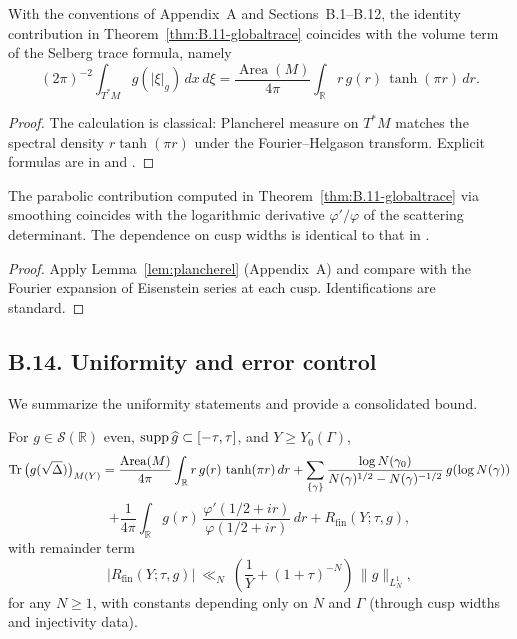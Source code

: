 \begin{proposition}\label{prop:B.13-norm}
With the conventions of Appendix~A and Sections~B.1–B.12, the identity contribution
in Theorem~\ref{thm:B.11-globaltrace} coincides with the volume term of the Selberg
trace formula, namely
\[
(2\pi)^{-2}\int_{T^*M} g(|\xi|_g)\,dx\,d\xi = \frac{\operatorname{Area}(M)}{4\pi}\int_{\mathbb R} r\,g(r)\,\tanh(\pi r)\,dr.
\]
\end{proposition}

\begin{proof}
The calculation is classical: Plancherel measure on $T^*M$ matches the spectral
density $r\tanh(\pi r)$ under the Fourier--Helgason transform. Explicit formulas
are in \cite[Chap.~7]{Hejhal1983} and \cite[§2.3]{Iwaniec2002}.
\end{proof}

\begin{lemma}\label{lem:B.13-parabolic}
The parabolic contribution computed in Theorem~\ref{thm:B.11-globaltrace} via
smoothing coincides with the logarithmic derivative $\varphi'/\varphi$ of the
scattering determinant. The dependence on cusp widths is identical to that in
\cite[§3]{Hejhal1983}.
\end{lemma}

\begin{proof}
Apply Lemma~\ref{lem:plancherel} (Appendix~A) and compare with the Fourier expansion
of Eisenstein series at each cusp. Identifications are standard.
\end{proof}

\subsection*{B.14. Uniformity and error control}

\noindent
We summarize the uniformity statements and provide a consolidated bound.

\begin{theorem}\label{thm:B.14-consolidated}
For $g\in\mathcal S(\mathbb R)$ even, $\operatorname{supp} \widehat g\subset [-\tau,\tau]$, and
$Y\ge Y_0(\Gamma)$,
\[
\operatorname{Tr}\big(g(\sqrt\Delta)\big)_{M(Y)} =
\frac{\operatorname{Area}(M)}{4\pi}\int_{\mathbb R} r\,g(r)\,\tanh(\pi r)\,dr
+ \sum_{\{\gamma\}} \frac{\log N(\gamma_0)}{N(\gamma)^{1/2}-N(\gamma)^{-1/2}}\, g(\log N(\gamma))
\]
\[
+ \frac{1}{4\pi}\int_{\mathbb R} g(r)\,\frac{\varphi'(1/2+ir)}{\varphi(1/2+ir)}\,dr
+ R_{\mathrm{fin}}(Y;\tau,g),
\]
with remainder term
\[
|R_{\mathrm{fin}}(Y;\tau,g)| \ \ll_N\ \left(\frac{1}{Y} + (1+\tau)^{-N}\right)\,\|g\|_{L^1_N},
\]
for any $N\ge 1$, with constants depending only on $N$ and $\Gamma$ (through cusp widths and
injectivity data).
\end{theorem}

